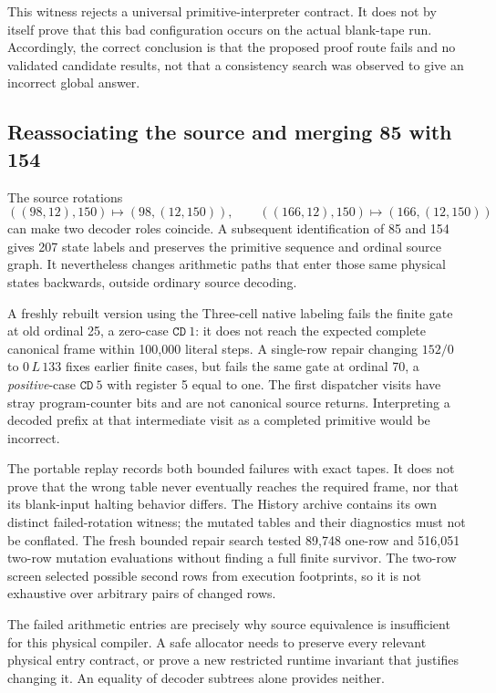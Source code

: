 \documentclass[11pt,a4paper]{article}
\theoremstyle{definition}
\newcommand{\CD}{\mathtt{CD}}
\begin{document}
This witness rejects a universal primitive-interpreter contract. It does not by itself prove that this bad configuration occurs on the actual blank-tape run. Accordingly, the correct conclusion is that the proposed proof route fails and no validated candidate results, not that a consistency search was observed to give an incorrect global answer.

\subsection{Reassociating the source and merging 85 with 154}

The source rotations
\[
((98,12),150)\mapsto(98,(12,150)),\qquad
((166,12),150)\mapsto(166,(12,150))
\]
can make two decoder roles coincide. A subsequent identification of 85 and 154 gives 207 state labels and preserves the primitive sequence and ordinal source graph. It nevertheless changes arithmetic paths that enter those same physical states backwards, outside ordinary source decoding.

A freshly rebuilt version using the Three-cell native labeling fails the finite gate at old ordinal 25, a zero-case $\CD\ 1$: it does not reach the expected complete canonical frame within 100,000 literal steps. A single-row repair changing $152/0$ to $0\,L\,133$ fixes earlier finite cases, but fails the same gate at ordinal 70, a \emph{positive}-case $\CD\ 5$ with register 5 equal to one. The first dispatcher visits have stray program-counter bits and are not canonical source returns. Interpreting a decoded prefix at that intermediate visit as a completed primitive would be incorrect.

The portable replay records both bounded failures with exact tapes. It does not prove that the wrong table never eventually reaches the required frame, nor that its blank-input halting behavior differs. The History archive contains its own distinct failed-rotation witness; the mutated tables and their diagnostics must not be conflated. The fresh bounded repair search tested 89,748 one-row and 516,051 two-row mutation evaluations without finding a full finite survivor. The two-row screen selected possible second rows from execution footprints, so it is not exhaustive over arbitrary pairs of changed rows.

The failed arithmetic entries are precisely why source equivalence is insufficient for this physical compiler. A safe allocator needs to preserve every relevant physical entry contract, or prove a new restricted runtime invariant that justifies changing it. An equality of decoder subtrees alone provides neither.
\end{document}
